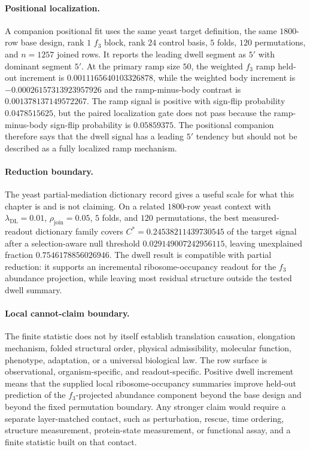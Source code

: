 \paragraph{Positional localization.}
A companion positional fit uses the same yeast target definition, the same $1800$-row base design, rank $1$ $f_3$ block, rank $24$ control basis, $5$ folds, $120$ permutations, and $n=1257$ joined rows.  It reports the leading dwell segment as $5'$ with dominant segment $5'$.  At the primary ramp size $50$, the weighted $f_3$ ramp held-out increment is $0.0011165640103326878$, while the weighted body increment is $-0.00026157313923957926$ and the ramp-minus-body contrast is $0.001378137149572267$.  The ramp signal is positive with sign-flip probability $0.0478515625$, but the paired localization gate does not pass because the ramp-minus-body sign-flip probability is $0.05859375$.  The positional companion therefore says that the dwell signal has a leading $5'$ tendency but should not be described as a fully localized ramp mechanism.

\paragraph{Reduction boundary.}
The yeast partial-mediation dictionary record gives a useful scale for what this chapter is and is not claiming.  On a related $1800$-row yeast context with $\lambda_{\mathrm{DL}}=0.01$, $\rho_{\mathrm{join}}=0.05$, $5$ folds, and $120$ permutations, the best measured-readout dictionary family covers $C^*=0.24538211439730545$ of the target signal after a selection-aware null threshold $0.029149007242956115$, leaving unexplained fraction $0.7546178856026946$.  The dwell result is compatible with partial reduction: it supports an incremental ribosome-occupancy readout for the $f_3$ abundance projection, while leaving most residual structure outside the tested dwell summary.

\paragraph{Local cannot-claim boundary.}
The finite statistic does not by itself establish translation causation, elongation mechanism, folded structural order, physical admissibility, molecular function, phenotype, adaptation, or a universal biological law.  The row surface is observational, organism-specific, and readout-specific.  Positive dwell increment means that the supplied local ribosome-occupancy summaries improve held-out prediction of the $f_3$-projected abundance component beyond the base design and beyond the fixed permutation boundary.  Any stronger claim would require a separate layer-matched contact, such as perturbation, rescue, time ordering, structure measurement, protein-state measurement, or functional assay, and a finite statistic built on that contact.